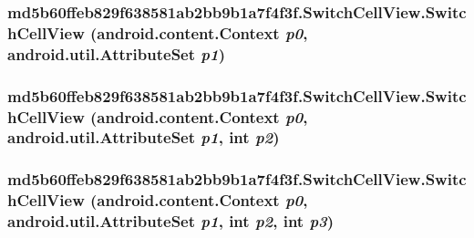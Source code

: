 \hypertarget{classmd5b60ffeb829f638581ab2bb9b1a7f4f3f_1_1_switch_cell_view_c3d2a947e764c684c9a5dad1a993e526}{
\subsubsection[{SwitchCellView}]{\setlength{\rightskip}{0pt plus 5cm}md5b60ffeb829f638581ab2bb9b1a7f4f3f.SwitchCellView.SwitchCellView (android.content.Context {\em p0}, \/  android.util.AttributeSet {\em p1})}}
\label{classmd5b60ffeb829f638581ab2bb9b1a7f4f3f_1_1_switch_cell_view_c3d2a947e764c684c9a5dad1a993e526}


\hypertarget{classmd5b60ffeb829f638581ab2bb9b1a7f4f3f_1_1_switch_cell_view_58a93fdb9b3b35555b2772e70d41d644}{
\subsubsection[{SwitchCellView}]{\setlength{\rightskip}{0pt plus 5cm}md5b60ffeb829f638581ab2bb9b1a7f4f3f.SwitchCellView.SwitchCellView (android.content.Context {\em p0}, \/  android.util.AttributeSet {\em p1}, \/  int {\em p2})}}
\label{classmd5b60ffeb829f638581ab2bb9b1a7f4f3f_1_1_switch_cell_view_58a93fdb9b3b35555b2772e70d41d644}


\hypertarget{classmd5b60ffeb829f638581ab2bb9b1a7f4f3f_1_1_switch_cell_view_674a5161d17501317efdded62c49a489}{
\subsubsection[{SwitchCellView}]{\setlength{\rightskip}{0pt plus 5cm}md5b60ffeb829f638581ab2bb9b1a7f4f3f.SwitchCellView.SwitchCellView (android.content.Context {\em p0}, \/  android.util.AttributeSet {\em p1}, \/  int {\em p2}, \/  int {\em p3})}}
\label{classmd5b60ffeb829f638581ab2bb9b1a7f4f3f_1_1_switch_cell_view_674a5161d17501317efdded62c49a489}




